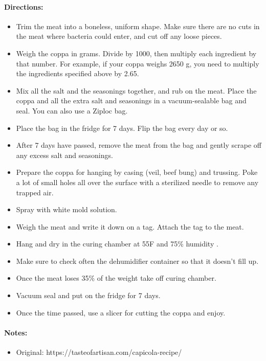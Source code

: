 \documentclass{article}
\begin{document}
\paragraph{Directions:}
\begin{itemize}
	\item Trim the meat into a boneless, uniform shape. Make sure there are no cuts in the meat where bacteria could enter, and cut off any loose pieces.
	\item Weigh the coppa in grams. Divide by 1000, then multiply each ingredient by that number. For example, if your coppa weighs 2650 g, you need to multiply the ingredients specified above by 2.65.
	\item Mix all the salt and the seasonings together, and rub on the meat. Place the coppa and all the extra salt and seasonings in a vacuum-sealable bag and seal. You can also use a Ziploc bag.
	\item Place the bag in the fridge for 7 days. Flip the bag every day or so.
	
	\item After 7 days have passed, remove the meat from the bag and gently scrape off any excess salt and seasonings.
	\item Prepare the coppa for hanging by casing (veil, beef bung) and trussing. Poke a lot of small holes all over the surface with a sterilized needle to remove any trapped air.
	\item Spray with white mold solution.
	\item Weigh the meat and write it down on a tag. Attach the tag to the meat.
	\item Hang and dry in the curing chamber at 55F and 75\% humidity .
	\item Make sure to check often the dehumidifier container so that it doesn't fill up.
	\item Once the meat loses 35\% of the weight take off curing chamber.
	\item Vacuum seal and put on the fridge for 7 days.
	\item Once the time passed, use a slicer for cutting the coppa and enjoy.
\end{itemize}

\paragraph{Notes:}
\begin{itemize}
	\item Original: https://tasteofartisan.com/capicola-recipe/
\end{itemize}
\end{document}
